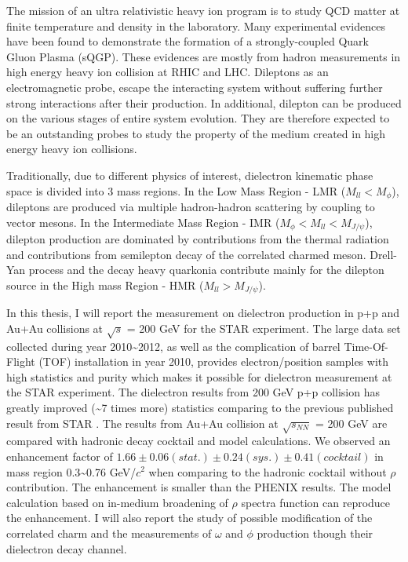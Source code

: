 \begin{eabstract}
The mission of an ultra relativistic heavy ion program is to study
QCD matter at finite temperature and density in the laboratory. Many
experimental evidences have been found to demonstrate the formation
of a strongly-coupled Quark Gluon Plasma (sQGP). These evidences are
mostly from hadron measurements in high energy heavy ion collision
at RHIC and LHC. Dileptons as an electromagnetic probe, escape the
interacting system without suffering further strong interactions after
their production. In additional, dilepton can be produced on the various
stages of entire system evolution. They are therefore expected to
be an outstanding probes to study the property of the medium created
in high energy heavy ion collisions. 

Traditionally, due to different physics of interest, dielectron kinematic
phase space is divided into 3 mass regions. In the Low Mass Region
- LMR ($M_{ll}<M_{\phi}$), dileptons are produced via multiple hadron-hadron
scattering by coupling to vector mesons. In the Intermediate Mass
Region - IMR ($M_{\phi}<M_{ll}<M_{J/\psi}$), dilepton production
are dominated by contributions from the thermal radiation and contributions
from semilepton decay of the correlated charmed meson. Drell-Yan process
and the decay heavy quarkonia contribute mainly for the dilepton source
in the High mass Region - HMR ($M_{ll}>M_{J/\psi}$).

In this thesis, I will report the measurement on dielectron production
in p+p and Au+Au collisions at $\sqrt{s}$ = 200 GeV for the STAR
experiment. The large data set collected during year 2010\textasciitilde{}2012,
as well as the complication of barrel Time-Of-Flight (TOF) installation
in year 2010, provides electron/position samples with high statistics
and purity which makes it possible for dielectron measurement at the
STAR experiment. The dielectron results from 200 GeV p+p collision
has greatly improved (\textasciitilde{}7 times more) statistics comparing
to the previous published result from STAR \cite{PhysRevC.86.024906}.
The results from Au+Au collision at $\sqrt{s_{NN}}$ = 200 GeV are
compared with hadronic decay cocktail and model calculations. We observed
an enhancement factor of \foreignlanguage{american}{$1.66\pm0.06(stat.)\pm0.24(sys.)\pm0.41(cocktail)$}
in mass region 0.3\textasciitilde{}0.76 GeV/$c^{2}$ when comparing
to the hadronic cocktail without $\rho$ contribution. The enhancement
is smaller than the PHENIX results. The model calculation based on
in-medium broadening of $\rho$ spectra function can reproduce the
enhancement. I will also report the study of possible modification
of the correlated charm and the measurements of $\omega$ and $\phi$
production though their dielectron decay channel. 

\end{eabstract}
\cleardoublepage{}

